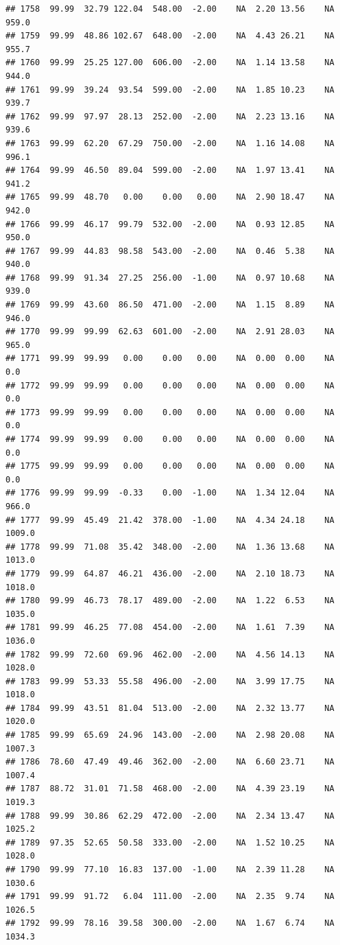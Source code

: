 \documentclass{article}\usepackage{graphicx, color}
\makeatletter
\newenvironment{kframe}{%
 \def\at@end@of@kframe{}%
 \ifinner\ifhmode%
  \def\at@end@of@kframe{\end{minipage}}%
  \begin{minipage}{\columnwidth}%
 \fi\fi%
 \def\FrameCommand##1{\hskip\@totalleftmargin \hskip-\fboxsep
 \colorbox{shadecolor}{##1}\hskip-\fboxsep
     \hskip-\linewidth \hskip-\@totalleftmargin \hskip\columnwidth}%
 \MakeFramed {\advance\hsize-\width
   \@totalleftmargin\z@ \linewidth\hsize
   \@setminipage}}%
 {\par\unskip\endMakeFramed%
 \at@end@of@kframe}
\newenvironment{knitrout}{}{} %
\makeatother
\begin{document}
\begin{knitrout}
\begin{kframe}
\begin{verbatim}
## 1758  99.99  32.79 122.04  548.00  -2.00    NA  2.20 13.56    NA  959.0
## 1759  99.99  48.86 102.67  648.00  -2.00    NA  4.43 26.21    NA  955.7
## 1760  99.99  25.25 127.00  606.00  -2.00    NA  1.14 13.58    NA  944.0
## 1761  99.99  39.24  93.54  599.00  -2.00    NA  1.85 10.23    NA  939.7
## 1762  99.99  97.97  28.13  252.00  -2.00    NA  2.23 13.16    NA  939.6
## 1763  99.99  62.20  67.29  750.00  -2.00    NA  1.16 14.08    NA  996.1
## 1764  99.99  46.50  89.04  599.00  -2.00    NA  1.97 13.41    NA  941.2
## 1765  99.99  48.70   0.00    0.00   0.00    NA  2.90 18.47    NA  942.0
## 1766  99.99  46.17  99.79  532.00  -2.00    NA  0.93 12.85    NA  950.0
## 1767  99.99  44.83  98.58  543.00  -2.00    NA  0.46  5.38    NA  940.0
## 1768  99.99  91.34  27.25  256.00  -1.00    NA  0.97 10.68    NA  939.0
## 1769  99.99  43.60  86.50  471.00  -2.00    NA  1.15  8.89    NA  946.0
## 1770  99.99  99.99  62.63  601.00  -2.00    NA  2.91 28.03    NA  965.0
## 1771  99.99  99.99   0.00    0.00   0.00    NA  0.00  0.00    NA    0.0
## 1772  99.99  99.99   0.00    0.00   0.00    NA  0.00  0.00    NA    0.0
## 1773  99.99  99.99   0.00    0.00   0.00    NA  0.00  0.00    NA    0.0
## 1774  99.99  99.99   0.00    0.00   0.00    NA  0.00  0.00    NA    0.0
## 1775  99.99  99.99   0.00    0.00   0.00    NA  0.00  0.00    NA    0.0
## 1776  99.99  99.99  -0.33    0.00  -1.00    NA  1.34 12.04    NA  966.0
## 1777  99.99  45.49  21.42  378.00  -1.00    NA  4.34 24.18    NA 1009.0
## 1778  99.99  71.08  35.42  348.00  -2.00    NA  1.36 13.68    NA 1013.0
## 1779  99.99  64.87  46.21  436.00  -2.00    NA  2.10 18.73    NA 1018.0
## 1780  99.99  46.73  78.17  489.00  -2.00    NA  1.22  6.53    NA 1035.0
## 1781  99.99  46.25  77.08  454.00  -2.00    NA  1.61  7.39    NA 1036.0
## 1782  99.99  72.60  69.96  462.00  -2.00    NA  4.56 14.13    NA 1028.0
## 1783  99.99  53.33  55.58  496.00  -2.00    NA  3.99 17.75    NA 1018.0
## 1784  99.99  43.51  81.04  513.00  -2.00    NA  2.32 13.77    NA 1020.0
## 1785  99.99  65.69  24.96  143.00  -2.00    NA  2.98 20.08    NA 1007.3
## 1786  78.60  47.49  49.46  362.00  -2.00    NA  6.60 23.71    NA 1007.4
## 1787  88.72  31.01  71.58  468.00  -2.00    NA  4.39 23.19    NA 1019.3
## 1788  99.99  30.86  62.29  472.00  -2.00    NA  2.34 13.47    NA 1025.2
## 1789  97.35  52.65  50.58  333.00  -2.00    NA  1.52 10.25    NA 1028.0
## 1790  99.99  77.10  16.83  137.00  -1.00    NA  2.39 11.28    NA 1030.6
## 1791  99.99  91.72   6.04  111.00  -2.00    NA  2.35  9.74    NA 1026.5
## 1792  99.99  78.16  39.58  300.00  -2.00    NA  1.67  6.74    NA 1034.3

\end{verbatim}
\end{kframe}
\end{knitrout}
\end{document}
